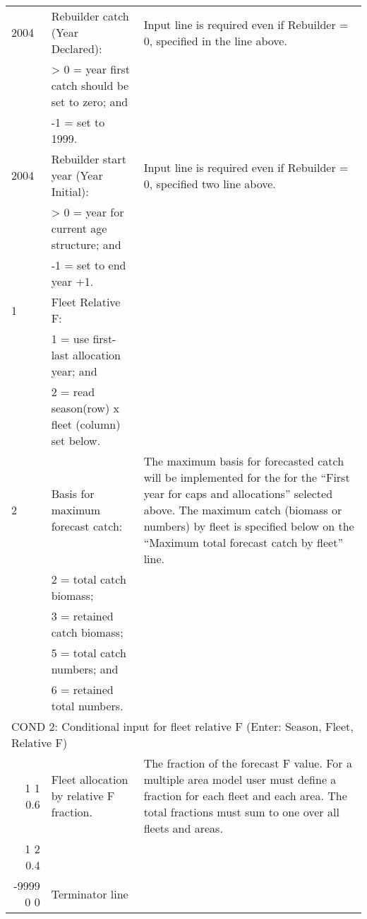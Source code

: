 \begin{landscape}
{\begin{longtable}{p{2cm} p{7cm} p{12cm}}
  \hline
  2004 & Rebuilder catch (Year Declared): & \multirow{1}{1cm}[-0.2cm]{\parbox{12cm}{Input line is required even if Rebuilder = 0, specified in the line above.}} \Tstrut\\
    & > 0 = year first catch should be set to zero; and & \\
    & -1 = set to 1999. & \Bstrut\\

  \hline
  2004 & Rebuilder start year (Year Initial): & \multirow{1}{1cm}[-0.2cm]{\parbox{12cm}{Input line is required even if Rebuilder = 0, specified two line above.}} \Tstrut\\
    & > 0 = year for current age structure; and & \\
    & -1 = set to end year +1. & \Bstrut\\

  \hline
  1 & Fleet Relative F: & \Tstrut\\
    & 1 = use first-last allocation year; and & \\
    & 2 = read season(row) x fleet (column) set below. & \Bstrut\\

  \hline 
  2 & Basis for maximum forecast catch: & \multirow{1}{1cm}[-0.25cm]{\parbox{12cm}{The maximum basis for forecasted catch will be implemented for the for the ``First year for caps and allocations'' selected above. The maximum catch (biomass or numbers) by fleet is specified below on the ``Maximum total forecast catch by fleet'' line.}} \Tstrut\\
    & 2 = total catch biomass; & \\
    & 3 = retained catch biomass; & \\
    & 5 = total catch numbers; and & \\
    & 6 = retained total numbers. & \Bstrut\\

  \hline 
  \multicolumn{3}{l}{COND 2: Conditional input for fleet relative F (Enter: Season, Fleet, Relative F)} \Tstrut\\
  \multicolumn{1}{r}{1 1 0.6} & Fleet allocation by relative F fraction. & \multirow{1}{1cm}[-0.25cm]{\parbox{12cm}{The fraction of the forecast F value. For a multiple area model user must define a fraction for each fleet and each area. The total fractions must sum to one over all fleets and areas.}} \\
  \multicolumn{1}{r}{1 2 0.4} & & \\
  \multicolumn{1}{r}{-9999 0 0} & Terminator line & \Bstrut\\ 


\end{longtable}}
\end{landscape}
